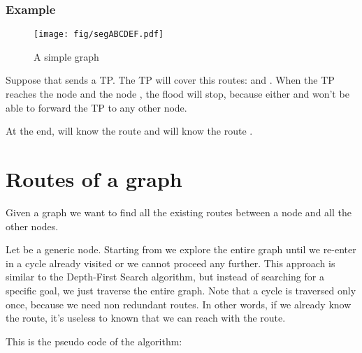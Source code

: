 \documentclass[a4paper]{article}
\begin{document}
\subsubsection*{Example}
\begin{figure}[h]
	\begin{center}
		\texttt{[image: fig/segABCDEF.pdf]}
	\end{center}
	\caption{A simple graph}
\end{figure}

Suppose that  sends a TP. The TP will cover this routes:
 and .
When the TP reaches the node  and the node , the flood will stop,
because either  and  won't be able to forward the TP to any other node.

At the end,  will know the route  and  will know the
route .

\section{Routes of a graph}
\label{sec:gen_routes}

Given a graph  we want to find all the existing routes between a node and
all the other nodes.

Let  be a generic node. Starting from  we explore the entire graph
until we re-enter in a cycle already visited or we cannot proceed any further.
This approach is similar to the Depth-First Search\cite{DFS} algorithm, but instead of
searching for a specific goal, we just traverse the entire graph.
Note that a cycle is traversed only once, because we need non redundant
routes. In other words, if we already know the  route,
it's useless to known that we can reach  with the  route.

This is the pseudo code of the algorithm:
\end{document}
